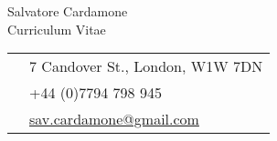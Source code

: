 \documentclass[11pt]{article} %
\begin{document}
\color{text1} %


\begin{minipage}[t]{0.49\textwidth}
\vspace{0pt}
{\huge{Salvatore Cardamone}}\\ %
{\color{headings} \Large{Curriculum Vitae}}
\end{minipage}\hfill
\begin{minipage}[t]{0.49\textwidth}
\vspace{1pt}
\colorbox{shade}{\textcolor{text1}{
\begin{tabular}{c|p{7cm}}
\raisebox{-3pt}{\textifsymbol{18}} & 7 Candover St., London, W1W 7DN \\ %
\raisebox{-2pt}{\Mobilefone} & +44 (0)7794 798 945 \\ %
\raisebox{-1pt}{\Letter} & \href{mailto:sc2018@cam.ac.uk}{sav.cardamone@gmail.com} \\ %
\end{tabular}
}}\\[10pt]
\end{minipage}\\
\end{document}
